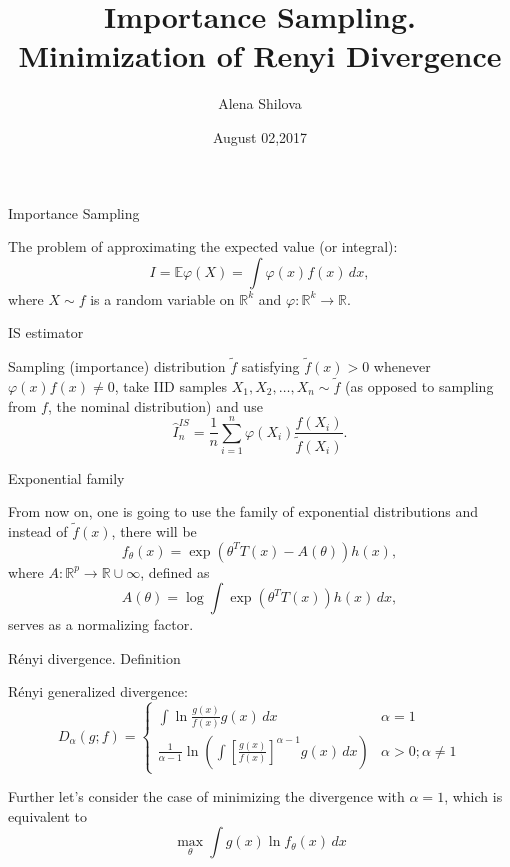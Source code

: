 \documentclass[10pt]{beamer}
\title{Importance Sampling. \\ Minimization of Renyi Divergence}
\author{Alena Shilova}
\date{August 02,2017}
\institute{Skoltech}
\begin{document}
\maketitle

\begin{frame}{Importance Sampling}

The problem of approximating the expected value (or integral):
\[
I = \mathbb{E}\varphi(X) =\int \varphi(x)f(x) \, dx,
\]
where $X \sim f$ is a random variable on $\mathbb{R}^k$ and $\varphi : \mathbb{R}^k \rightarrow \mathbb{R}$.

\begin{block}{IS estimator}

Sampling (importance) distribution $\tilde f$ satisfying $\tilde f(x) > 0$ whenever $ \varphi(x)f(x) \neq 0$, take IID samples $X_1,X_2, \dots,X_n \sim \tilde f$ (as opposed to sampling from $f$, the
nominal distribution) and use
\[
\hat I^{IS}_n = \frac 1n \sum^n_{i=1} \varphi(X_i) \frac{f(X_i)}{\tilde f(X_i)}.
\]
\end{block}
\end{frame}

\begin{frame}{Exponential family}

From now on, one is going to use the family of exponential distributions and instead of $\tilde f(x)$, there will be 
\[
f_{\theta}(x) = \exp(\theta^TT(x) - A(\theta))h(x),
\]
where $A : \mathbb{R}^p \rightarrow \mathbb{R} \cup \infty$, defined as
\[
A(\theta) = \log \int \exp(\theta^T T(x))h(x) \, dx,
\]
serves as a normalizing factor.

\end{frame}

\begin{frame}{R\'enyi divergence. Definition}


R\'enyi generalized divergence:
\[
D_{\alpha}(g; f) = \begin{cases} \int \ln \frac{g(x)}{f(x)} g(x) \, dx  & \alpha = 1 \\
\frac1{\alpha - 1}  \ln \left(\int \left[ \frac{g(x)}{f(x)} \right]^{\alpha -1} g(x) \, dx \right) &  \alpha > 0; \alpha \neq 1
\end{cases}
\]

Further let's consider the case of minimizing the divergence with $\alpha = 1$, which is equivalent to
\[
\max_{\theta} \int g(x) \ln f_{\theta}(x) \, dx
\]

\end{frame}
\end{document}
